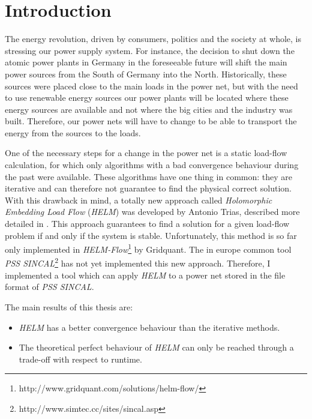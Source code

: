 \chapter{Introduction}
The energy revolution, driven by consumers, politics and the society at whole, is stressing our power supply system. For instance, the decision to shut down the atomic power plants in Germany in the foreseeable future will shift the main power sources from the South of Germany into the North. Historically, these sources were placed close to the main loads in the power net, but with the need to use renewable energy sources our power plants will be located where these energy sources are available and not where the big cities and the industry was built. Therefore, our power nets will have to change to be able to transport the energy from the sources to the loads.

One of the necessary steps for a change in the power net is a static load-flow calculation, for which only algorithms with a bad convergence behaviour during the past were available. These algorithms have one thing in common: they are iterative and can therefore not guarantee to find the physical correct solution. With this drawback in mind, a totally new approach called \emph{Holomorphic Embedding Load Flow} (\emph{HELM})  \citep{helmIEEE} was developed by Antonio Trias, described more detailed in . This approach guarantees to find a solution for a given load-flow problem if and only if the system is stable. Unfortunately, this method is so far only implemented in \emph{HELM-Flow}\footnote{http://www.gridquant.com/solutions/helm-flow/} by Gridquant. The in europe common tool \emph{PSS SINCAL}\footnote{http://www.simtec.cc/sites/sincal.asp} has not yet implemented this new approach. Therefore, I implemented a tool which can apply \emph{HELM} to a power net stored in the file format of \emph{PSS SINCAL}.

The main results of this thesis are:
\begin{itemize}
	\item \emph{HELM} has a better convergence behaviour than the iterative methods.
	\item The theoretical perfect behaviour of \emph{HELM} can only be reached through a trade-off with respect to runtime.
\end{itemize}